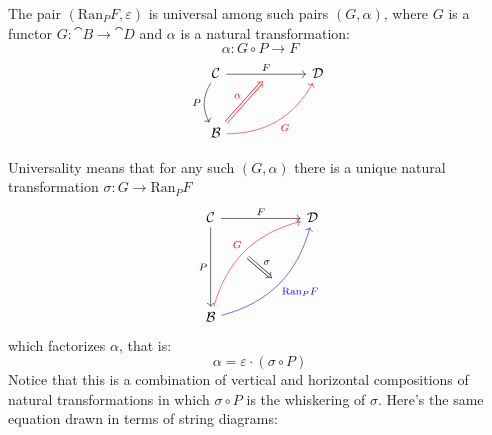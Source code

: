 \documentclass[DaoFP]{subfiles}
\begin{document}
The pair $(\text{Ran}_P F, \varepsilon)$ is universal among such pairs $(G, \alpha)$, where $G$ is a functor $G \colon \cat B \to \cat D$ and $\alpha$ is a natural transformation:
\[ \alpha \colon G \circ P \to F \]
\[
 \begin{tikzcd} [row sep=1cm, column sep=1cm]
 \cat C
 \arrow[rr, "F", "" {name=ID, below} ]
 \arrow[d, bend right, "P"']
 && \cat D
 \\
 \cat B
  \arrow[urr, red, bend right, "G"']
 \arrow[Rightarrow, red, "\alpha",  to=ID]
 \end{tikzcd}
\]

Universality means that for any such $(G, \alpha)$ there is a unique natural transformation $\sigma \colon G \to \text{Ran}_P F$
\[
\begin{tikzcd}[row sep=2cm, column sep=2cm]
\cat C  \ar[d, "P"', "" {name=P}]
            \ar[r, "F", ""  {name=F, below, near start, bend right}]
&
\cat D
\\
\cat B
    \ar[ur, red, bend left, "G", "" {name=G, below}]
    \ar[ur, blue, bend right, "\text{Ran}_P F"', "" {name=Ran}]
\arrow[Rightarrow, "\sigma", from=G, to=Ran]
\end{tikzcd}
\]
 which factorizes $\alpha$, that is:
\[ \alpha = \varepsilon \cdot (\sigma \circ P) \]
Notice that this is a combination of vertical and horizontal compositions of natural transformations in which $\sigma \circ P$ is the whiskering of $\sigma$. Here's the same equation drawn in terms of string diagrams:
\end{document}
